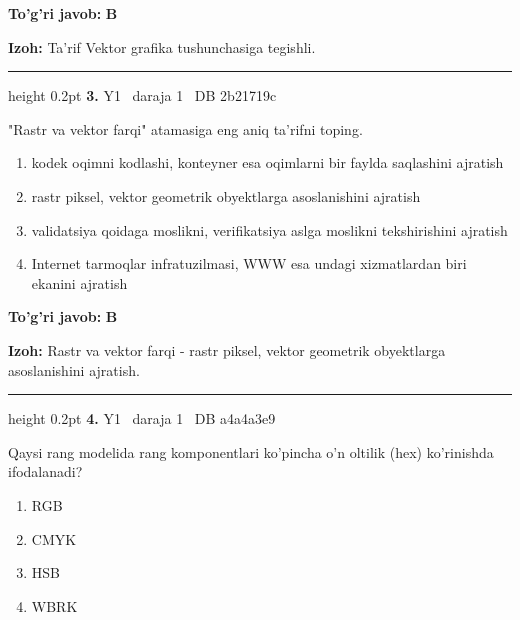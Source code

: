 \documentclass[10pt,a4paper,oneside]{article}
\begin{document}
\begin{tcolorbox}[enhanced,breakable,colback=teal!4,colframe=teal!45!black,boxrule=0.45pt,arc=1.2mm,left=2.8mm,right=2.8mm,top=2mm,bottom=2mm,before skip=2mm,after skip=2mm]
\textbf{\color{teal}To'g'ri javob:} \textbf{B}
\par\smallskip
\textbf{Izoh:} Ta'rif Vektor grafika tushunchasiga tegishli.
\end{tcolorbox}
\vspace{2mm}\hrule height 0.2pt \vspace{4mm}
\hypertarget{q3}{\textbf{\color{ink}3.}}  {\color{muted}\scriptsize Y1 \textbullet\ daraja 1 \textbullet\ DB 2b21719c}
\par
"Rastr va vektor farqi" atamasiga eng aniq ta'rifni toping.
\begin{enumerate}[label=\Alph*),leftmargin=9mm]
\item kodek oqimni kodlashi, konteyner esa oqimlarni bir faylda saqlashini ajratish
\item rastr piksel, vektor geometrik obyektlarga asoslanishini ajratish
\item validatsiya qoidaga moslikni, verifikatsiya aslga moslikni tekshirishini ajratish
\item Internet tarmoqlar infratuzilmasi, WWW esa undagi xizmatlardan biri ekanini ajratish
\end{enumerate}
\begin{tcolorbox}[enhanced,breakable,colback=teal!4,colframe=teal!45!black,boxrule=0.45pt,arc=1.2mm,left=2.8mm,right=2.8mm,top=2mm,bottom=2mm,before skip=2mm,after skip=2mm]
\textbf{\color{teal}To'g'ri javob:} \textbf{B}
\par\smallskip
\textbf{Izoh:} Rastr va vektor farqi - rastr piksel, vektor geometrik obyektlarga asoslanishini ajratish.
\end{tcolorbox}
\vspace{2mm}\hrule height 0.2pt \vspace{4mm}
\hypertarget{q4}{\textbf{\color{ink}4.}}  {\color{muted}\scriptsize Y1 \textbullet\ daraja 1 \textbullet\ DB a4a4a3e9}
\par
Qaysi rang modelida rang komponentlari ko'pincha o'n oltilik (hex) ko'rinishda ifodalanadi?
\begin{enumerate}[label=\Alph*),leftmargin=9mm]
\item RGB
\item CMYK
\item HSB
\item WBRK
\end{enumerate}
\end{document}
